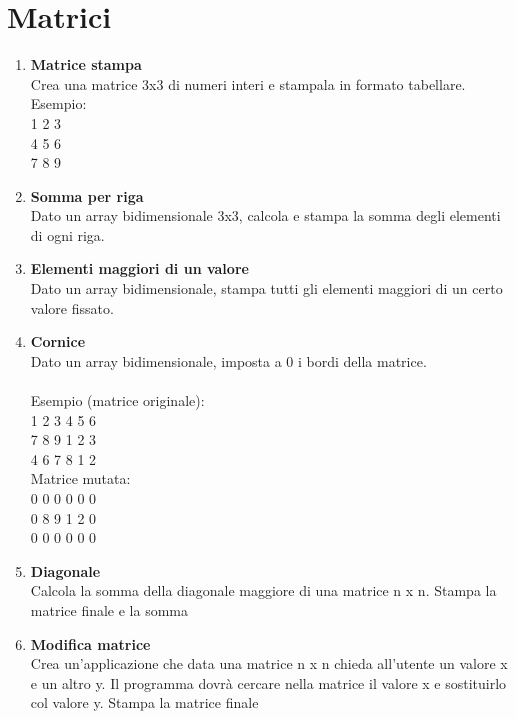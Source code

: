 \documentclass{article}
\begin{document}
\section{Matrici}
    \begin{enumerate}
        \item \textbf{Matrice stampa} \\
        Crea una matrice 3x3 di numeri interi e stampala in formato tabellare. \\
        Esempio: \\
        1 2 3 \\
        4 5 6 \\ 
        7 8 9 \\

        \item \textbf{Somma per riga} \\
        Dato un array bidimensionale 3x3, calcola e stampa la somma degli elementi di ogni riga.

        \item \textbf{Elementi maggiori di un valore} \\
        Dato un array bidimensionale, stampa tutti gli elementi maggiori di un certo valore fissato.
        
        \item \textbf{Cornice} \\
        Dato un array bidimensionale, imposta a 0 i bordi della matrice. \\ \\
        Esempio (matrice originale): \\
        1 2 3 4 5 6 \\
        7 8 9 1 2 3 \\
        4 6 7 8 1 2 \\

        Matrice mutata: \\
        0 0 0 0 0 0 \\
        0 8 9 1 2 0 \\ 
        0 0 0 0 0 0 \\ 

        \item \textbf{Diagonale} \\
        Calcola la somma della diagonale maggiore di una matrice n x n. Stampa la matrice finale e la somma

        \item \textbf{Modifica matrice} \\
        Crea un'applicazione che data una matrice n x n chieda all'utente un valore x e un altro y.
        Il programma dovrà cercare nella matrice il valore x e sostituirlo col valore y. Stampa la matrice finale

    \end{enumerate}
\end{document}
